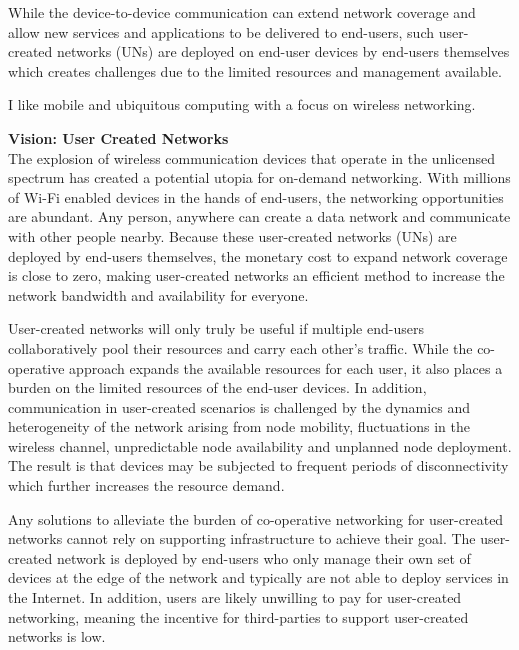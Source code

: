 \documentclass[10pt]{article}
\begin{document}
While the device-to-device communication can extend network coverage
and allow new services and applications to be delivered to end-users, such
user-created networks (UNs) are deployed on end-user devices by end-users
themselves which creates challenges due to the limited resources and management
available.

I like mobile and ubiquitous computing with a focus on wireless networking.


\noindent \textbf{Vision: User Created Networks} \\
The explosion of wireless communication devices that operate in the
unlicensed spectrum has created a potential utopia for on-demand networking.
With millions of Wi-Fi enabled devices in the hands of end-users, the
networking opportunities are abundant.
Any person, anywhere can create a data network and communicate with other people
nearby.  
Because these user-created networks (UNs) are deployed by end-users themselves,
the monetary cost to
expand network coverage is close to zero, making user-created networks an
efficient method to increase the network bandwidth and availability
for everyone.

User-created networks will only truly be useful if multiple end-users 
collaboratively pool their resources and carry each other's
traffic.  While the co-operative approach expands the available resources for
each user, it also places a burden on the limited resources of the end-user
devices.
In addition, communication in user-created scenarios is challenged by the
dynamics and heterogeneity of the network arising
from node mobility, fluctuations in the
wireless channel, unpredictable
node availability and unplanned node deployment.
The result is that devices may be subjected to frequent periods of
disconnectivity which further increases the resource demand.


Any solutions to alleviate the burden of
co-operative networking for user-created networks
cannot rely on supporting infrastructure to achieve their goal.
The user-created network is deployed by end-users who only manage
their own set of devices at the edge of the network and typically are
not able to deploy services in the Internet.  In addition, users are likely
unwilling to pay for user-created networking, meaning the incentive for
third-parties to support user-created networks is low.
\end{document}
